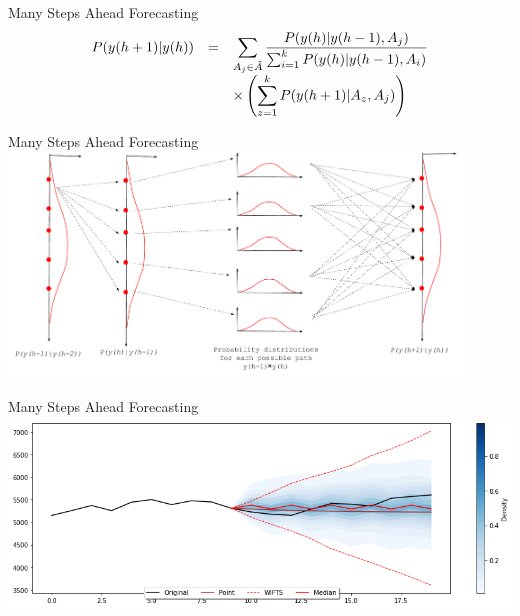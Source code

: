 \documentclass{beamer}
\begin{document}

\begin{frame}{Many Steps Ahead Forecasting}
$$
\begin{array}{rcl}
P(y(h+1) | y(h))     & = &  \displaystyle \sum_{A_j \in \tilde{A}} \frac{ P(y(h)| y(h-1), A_j)}{ \sum_{i = 1}^k P(y(h)| y(h-1), A_i)}  \\
     & & \displaystyle \times  \left(  \sum_{z = 1}^k  P(y(h+1) | A_z,A_j) \right) 
\end{array}
$$
\end{frame}

\note[itemize]{
    \item 
}

\begin{frame}{Many Steps Ahead Forecasting}
\includegraphics[width=\textwidth,height=6cm]{figures/pwfts_probabilistic_manysteps.pdf}
\end{frame}


\begin{frame}{Many Steps Ahead Forecasting}
\includegraphics[width=\textwidth]{figures/pwfts_sample_manystep.png}
\end{frame}
\end{document}
